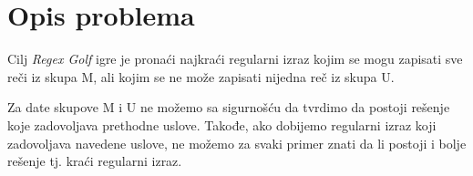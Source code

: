 \section{Opis problema}
    
    \frame{\sectionpage}
    
    \begin{frame}{}
        Cilj \textit{Regex Golf} igre je pronaći najkraći regularni
    izraz kojim se mogu zapisati sve reči iz skupa M, ali kojim se ne može zapisati nijedna reč iz skupa U. 
    \end{frame}
    
    \begin{frame}{}
    Za date skupove M i U ne možemo sa sigurnošću da tvrdimo da postoji rešenje
    koje zadovoljava prethodne uslove. Takođe, ako dobijemo regularni izraz koji zadovoljava navedene uslove, ne možemo za svaki primer znati da li postoji i bolje rešenje tj. kraći regularni izraz.
    \end{frame}